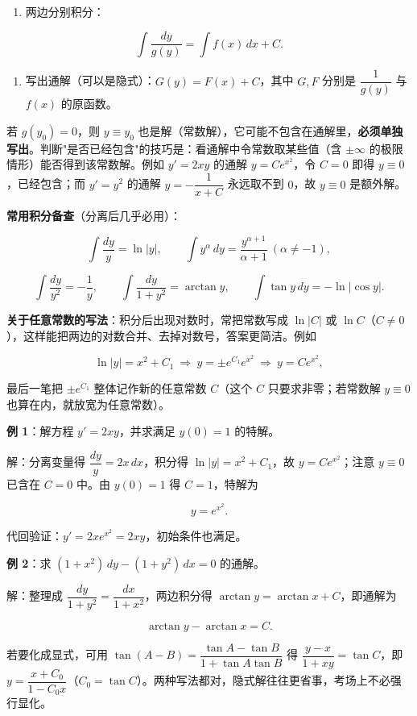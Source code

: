 \documentclass[11pt,openany,UTF8]{ctexbook}
\begin{document}
\begin{enumerate}
\item 两边分别积分：
\end{enumerate}
\[\int \frac{dy}{g(y)}=\int f(x)\,dx+C .\]

\begin{enumerate}
\item 写出通解（可以是隐式）：$G(y)=F(x)+C$，其中 $G,F$ 分别是 $\dfrac1{g(y)}$ 与 $f(x)$ 的原函数。
\end{enumerate}
若 $g(y_0)=0$，则 $y\equiv y_0$ 也是解（常数解），它可能不包含在通解里，\textbf{必须单独写出}。判断"是否已经包含"的技巧是：看通解中令常数取某些值（含 $\pm\infty$ 的极限情形）能否得到该常数解。例如 $y'=2xy$ 的通解 $y=Ce^{x^2}$，令 $C=0$ 即得 $y\equiv 0$，已经包含；而 $y'=y^2$ 的通解 $y=-\dfrac{1}{x+C}$ 永远取不到 $0$，故 $y\equiv 0$ 是额外解。

\textbf{常用积分备查}（分离后几乎必用）：

\[\int\frac{dy}{y}=\ln\vert y\vert,\qquad \int y^{\alpha}\,dy=\frac{y^{\alpha+1}}{\alpha+1}\ (\alpha\ne-1),\]

\[\int\frac{dy}{y^{2}}=-\frac1y,\qquad \int\frac{dy}{1+y^{2}}=\arctan y,\qquad \int\tan y\,dy=-\ln\vert\cos y\vert .\]

\textbf{关于任意常数的写法}：积分后出现对数时，常把常数写成 $\ln\vert C\vert$ 或 $\ln C$（$C\ne 0$），这样能把两边的对数合并、去掉对数号，答案更简洁。例如

\[\ln\vert y\vert=x^{2}+C_1\ \Longrightarrow\ y=\pm e^{C_1}e^{x^{2}}\ \Longrightarrow\ y=Ce^{x^{2}},\]

最后一笔把 $\pm e^{C_1}$ 整体记作新的任意常数 $C$（这个 $C$ 只要求非零；若常数解 $y\equiv 0$ 也算在内，就放宽为任意常数）。

\textbf{例 1}：解方程 $y'=2xy$，并求满足 $y(0)=1$ 的特解。

解：分离变量得 $\dfrac{dy}{y}=2x\,dx$，积分得 $\ln\vert y\vert=x^2+C_1$，故 $y=Ce^{x^2}$；注意 $y\equiv 0$ 已含在 $C=0$ 中。由 $y(0)=1$ 得 $C=1$，特解为

\[y=e^{x^2}.\]

代回验证：$y'=2xe^{x^2}=2xy$，初始条件也满足。

\textbf{例 2}：求 $(1+x^{2})\,dy-(1+y^{2})\,dx=0$ 的通解。

解：整理成 $\dfrac{dy}{1+y^{2}}=\dfrac{dx}{1+x^{2}}$，两边积分得 $\arctan y=\arctan x+C$，即通解为

\[\arctan y-\arctan x=C .\]

若要化成显式，可用 $\tan(A-B)=\dfrac{\tan A-\tan B}{1+\tan A\tan B}$ 得 $\dfrac{y-x}{1+xy}=\tan C$，即 $y=\dfrac{x+C_0}{1-C_0x}$（$C_0=\tan C$）。两种写法都对，隐式解往往更省事，考场上不必强行显化。
\end{document}
